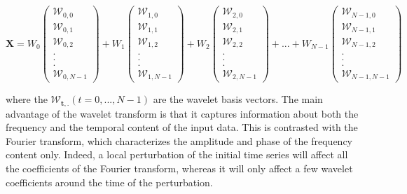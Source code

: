 \documentclass[main.tex]{subfiles}
\begin{document}
\begin{equation}
\bm{X} = W_0 \begin{pmatrix} \mathcal{W}_{0 , 0} \\ \mathcal{W}_{0 , 1} \\ \mathcal{W}_{0 , 2} \\ . \\ . \\ . \\ \mathcal{W}_{0 , N - 1} \end{pmatrix}
+ W_1 \begin{pmatrix} \mathcal{W}_{1 , 0} \\ \mathcal{W}_{1 , 1} \\ \mathcal{W}_{1 , 2} \\ . \\ . \\ . \\ \mathcal{W}_{1 , N - 1} \end{pmatrix}
+ W_2 \begin{pmatrix} \mathcal{W}_{2 , 0} \\ \mathcal{W}_{2 , 1} \\ \mathcal{W}_{2 , 2} \\ . \\ . \\ . \\ \mathcal{W}_{2 , N - 1} \end{pmatrix}
+ ... + W_{N - 1} \begin{pmatrix} \mathcal{W}_{N - 1 , 0} \\ \mathcal{W}_{N - 1 , 1} \\ \mathcal{W}_{N - 1 , 2} \\ . \\ . \\ . \\ \mathcal{W}_{N - 1 , N - 1} \end{pmatrix}
\end{equation}

where the $\bm{\mathcal{W}_{t , .}} \left( t = 0 , ... , N - 1 \right)$ are the wavelet basis vectors. The main advantage of the wavelet transform is that it captures information about both the frequency and the temporal content of the input data. This is contrasted with the Fourier transform, which characterizes the amplitude and phase of the frequency content only. Indeed, a local perturbation of the initial time series will affect all the coefficients of the Fourier transform, whereas it will only affect a few wavelet coefficients around the time of the perturbation. \\ 
\end{document}
